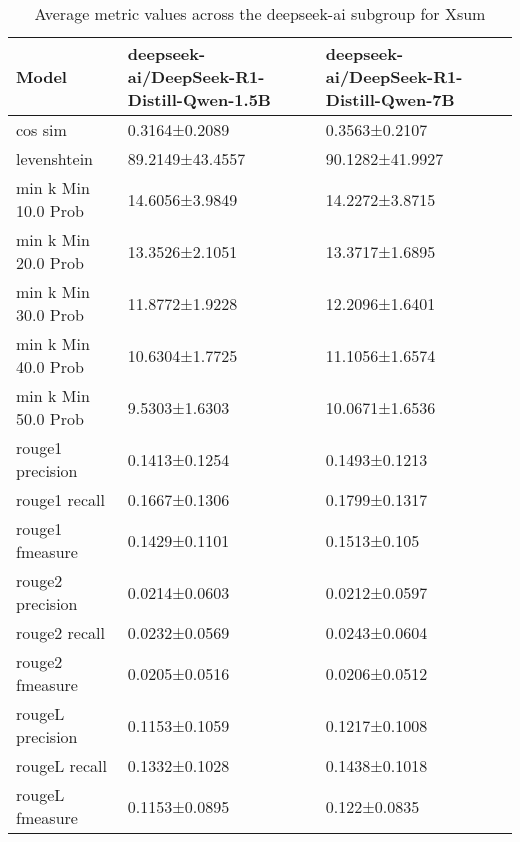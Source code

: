 \begin{table}
\caption{Average metric values across the deepseek-ai subgroup for Xsum}
\label{tab:}
\begin{tabular}{lll}
\toprule
Model & deepseek-ai/DeepSeek-R1-Distill-Qwen-1.5B & deepseek-ai/DeepSeek-R1-Distill-Qwen-7B \\
\midrule
cos sim & 0.3164±0.2089 & 0.3563±0.2107 \\
levenshtein & 89.2149±43.4557 & 90.1282±41.9927 \\
min k Min 10.0 Prob & 14.6056±3.9849 & 14.2272±3.8715 \\
min k Min 20.0 Prob & 13.3526±2.1051 & 13.3717±1.6895 \\
min k Min 30.0 Prob & 11.8772±1.9228 & 12.2096±1.6401 \\
min k Min 40.0 Prob & 10.6304±1.7725 & 11.1056±1.6574 \\
min k Min 50.0 Prob & 9.5303±1.6303 & 10.0671±1.6536 \\
rouge1 precision & 0.1413±0.1254 & 0.1493±0.1213 \\
rouge1 recall & 0.1667±0.1306 & 0.1799±0.1317 \\
rouge1 fmeasure & 0.1429±0.1101 & 0.1513±0.105 \\
rouge2 precision & 0.0214±0.0603 & 0.0212±0.0597 \\
rouge2 recall & 0.0232±0.0569 & 0.0243±0.0604 \\
rouge2 fmeasure & 0.0205±0.0516 & 0.0206±0.0512 \\
rougeL precision & 0.1153±0.1059 & 0.1217±0.1008 \\
rougeL recall & 0.1332±0.1028 & 0.1438±0.1018 \\
rougeL fmeasure & 0.1153±0.0895 & 0.122±0.0835 \\
\bottomrule
\end{tabular}
\end{table}
